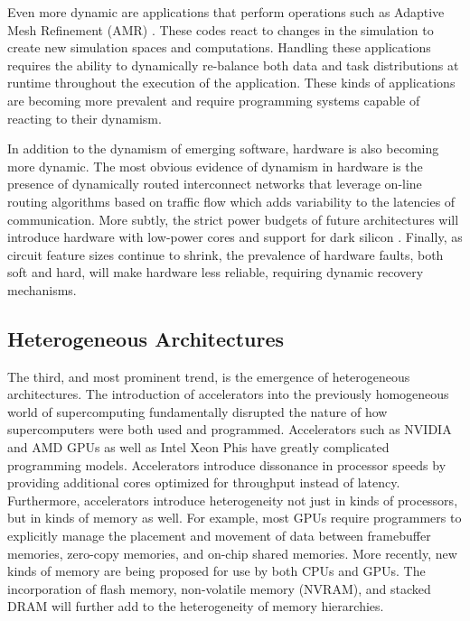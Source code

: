 Even more dynamic are applications that perform
operations such as Adaptive Mesh Refinement (AMR)
 \cite{BoxLib,Chombo}. These codes react to changes
in the simulation to create new simulation spaces
and computations. Handling these applications requires
the ability to dynamically re-balance both data and
task distributions at runtime throughout the
execution of the application. These kinds of applications
are becoming more prevalent and require programming
systems capable of reacting to their dynamism.

In addition to the dynamism of emerging software, hardware
is also becoming more dynamic. The most obvious 
evidence of dynamism in hardware is the presence of dynamically
routed interconnect networks that leverage on-line
routing algorithms based on traffic flow \cite{CrayGemini}
which adds variability to the latencies of communication.
More subtly, the strict power budgets of future 
architectures will introduce hardware with low-power
cores \cite{Tegra} and support for dark silicon \cite{DarkSilicon11}. 
Finally, as circuit feature sizes continue to shrink, the 
prevalence of hardware faults, both soft and hard, will make 
hardware less reliable, requiring dynamic recovery mechanisms.


\subsection{Heterogeneous Architectures}
\label{subsec:heterogeneous}

The third, and most prominent trend, is the emergence 
of heterogeneous architectures.
The introduction of accelerators into the previously
homogeneous world of supercomputing fundamentally disrupted 
the nature of how supercomputers were both used and
programmed. Accelerators such as NVIDIA 
and AMD GPUs as well as Intel Xeon Phis have greatly
complicated programming models. Accelerators introduce dissonance
in processor speeds by providing additional cores
optimized for throughput instead of latency. Furthermore,
accelerators introduce heterogeneity not just in kinds
of processors, but in kinds of memory as well. For example,
most GPUs require programmers to explicitly manage
the placement and movement of data between framebuffer
memories, zero-copy memories, and on-chip shared memories.
More recently, new kinds of memory are being
proposed for use by both CPUs and GPUs. The incorporation 
of flash memory, non-volatile memory (NVRAM), and 
stacked DRAM will further add to the heterogeneity of
memory hierarchies.

